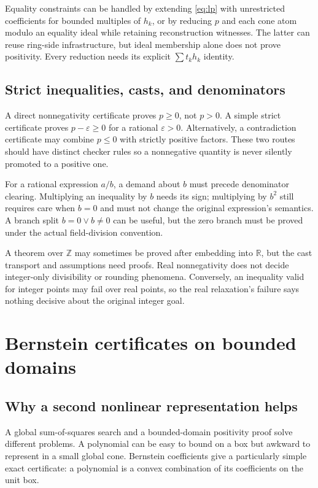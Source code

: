 \documentclass[11pt,letterpaper]{article}
\newcommand{\R}{\mathbb{R}}
\newcommand{\Z}{\mathbb{Z}}
\theoremstyle{definition}
\theoremstyle{remark}
\begin{document}
Equality constraints can be handled by extending \eqref{eq:lp} with unrestricted coefficients for bounded multiples of $h_k$, or by reducing $p$ and each cone atom modulo an equality ideal while retaining reconstruction witnesses. The latter can reuse ring-side infrastructure, but ideal membership alone does not prove positivity. Every reduction needs its explicit $\sum t_kh_k$ identity.

\subsection{Strict inequalities, casts, and denominators}
A direct nonnegativity certificate proves $p\geq0$, not $p>0$. A simple strict certificate proves $p-\varepsilon\geq0$ for a rational $\varepsilon>0$. Alternatively, a contradiction certificate may combine $p\leq0$ with strictly positive factors. These two routes should have distinct checker rules so a nonnegative quantity is never silently promoted to a positive one.

For a rational expression $a/b$, a demand about $b$ must precede denominator clearing. Multiplying an inequality by $b$ needs its sign; multiplying by $b^2$ still requires care when $b=0$ and must not change the original expression's semantics. A branch split $b=0\lor b\ne0$ can be useful, but the zero branch must be proved under the actual field-division convention.

A theorem over $\Z$ may sometimes be proved after embedding into $\R$, but the cast transport and assumptions need proofs. Real nonnegativity does not decide integer-only divisibility or rounding phenomena. Conversely, an inequality valid for integer points may fail over real points, so the real relaxation's failure says nothing decisive about the original integer goal.

\section{Bernstein certificates on bounded domains}
\subsection{Why a second nonlinear representation helps}
A global sum-of-squares search and a bounded-domain positivity proof solve different problems. A polynomial can be easy to bound on a box but awkward to represent in a small global cone. Bernstein coefficients give a particularly simple exact certificate: a polynomial is a convex combination of its coefficients on the unit box.
\end{document}
